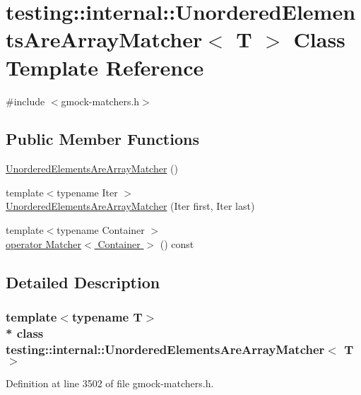 \hypertarget{classtesting_1_1internal_1_1_unordered_elements_are_array_matcher}{}\section{testing\+:\+:internal\+:\+:Unordered\+Elements\+Are\+Array\+Matcher$<$ T $>$ Class Template Reference}
\label{classtesting_1_1internal_1_1_unordered_elements_are_array_matcher}


{\ttfamily \#include $<$gmock-\/matchers.\+h$>$}

\subsection*{Public Member Functions}
\begin{DoxyCompactItemize}
\item 
\hyperlink{classtesting_1_1internal_1_1_unordered_elements_are_array_matcher_a2a732fdc8ba5918a5337b11df3c556f3}{Unordered\+Elements\+Are\+Array\+Matcher} ()
\item 
{\footnotesize template$<$typename Iter $>$ }\\\hyperlink{classtesting_1_1internal_1_1_unordered_elements_are_array_matcher_a5a91694cf5088cb0b7f4b1bb57dee957}{Unordered\+Elements\+Are\+Array\+Matcher} (Iter first, Iter last)
\item 
{\footnotesize template$<$typename Container $>$ }\\\hyperlink{classtesting_1_1internal_1_1_unordered_elements_are_array_matcher_a85c0528e207ce62a32218b35fddb05c5}{operator Matcher$<$ Container $>$} () const 
\end{DoxyCompactItemize}


\subsection{Detailed Description}
\subsubsection*{template$<$typename T$>$\\*
class testing\+::internal\+::\+Unordered\+Elements\+Are\+Array\+Matcher$<$ T $>$}



Definition at line 3502 of file gmock-\/matchers.\+h.



